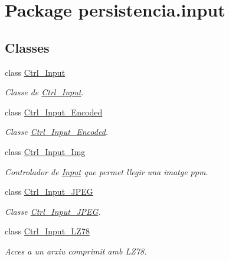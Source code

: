 \hypertarget{namespacepersistencia_1_1input}{}\section{Package persistencia.\+input}
\label{namespacepersistencia_1_1input}
\subsection*{Classes}
\begin{DoxyCompactItemize}
\item 
class \hyperlink{classpersistencia_1_1input_1_1Ctrl__Input}{Ctrl\+\_\+\+Input}
\begin{DoxyCompactList}\small\item\em Classe de \hyperlink{classpersistencia_1_1input_1_1Ctrl__Input}{Ctrl\+\_\+\+Input}. \end{DoxyCompactList}\item 
class \hyperlink{classpersistencia_1_1input_1_1Ctrl__Input__Encoded}{Ctrl\+\_\+\+Input\+\_\+\+Encoded}
\begin{DoxyCompactList}\small\item\em Classe \hyperlink{classpersistencia_1_1input_1_1Ctrl__Input__Encoded}{Ctrl\+\_\+\+Input\+\_\+\+Encoded}. \end{DoxyCompactList}\item 
class \hyperlink{classpersistencia_1_1input_1_1Ctrl__Input__Img}{Ctrl\+\_\+\+Input\+\_\+\+Img}
\begin{DoxyCompactList}\small\item\em Controlador de \hyperlink{classpersistencia_1_1input_1_1Input}{Input} que permet llegir una imatge ppm. \end{DoxyCompactList}\item 
class \hyperlink{classpersistencia_1_1input_1_1Ctrl__Input__JPEG}{Ctrl\+\_\+\+Input\+\_\+\+J\+P\+EG}
\begin{DoxyCompactList}\small\item\em Classe \hyperlink{classpersistencia_1_1input_1_1Ctrl__Input__JPEG}{Ctrl\+\_\+\+Input\+\_\+\+J\+P\+EG}. \end{DoxyCompactList}\item 
class \hyperlink{classpersistencia_1_1input_1_1Ctrl__Input__LZ78}{Ctrl\+\_\+\+Input\+\_\+\+L\+Z78}
\begin{DoxyCompactList}\small\item\em Acces a un arxiu comprimit amb L\+Z78. \end{DoxyCompactList}\item 

\end{DoxyCompactItemize}
